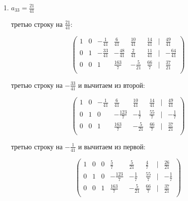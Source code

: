 \documentclass{report}
\begin{document}
\begin{itemize}
\begin{enumerate}
\begin{itemize}
				
				
				
			\end{itemize}
			
			\item{$a_{33}=\frac{21}{41}$}
			
			\begin{itemize}
				
				 третью строку на $\frac{21}{41}$:
				
				\begin{center}
					\Large{
						\[
						\begin{pmatrix}
							1 & 0 & -\frac{1}{41} & \frac{6}{41} & \frac{10}{41} & \frac{14}{41} & | & \frac{49}{41} \\
							0 & 1 & -\frac{33}{41} & -\frac{48}{41} & \frac{2}{41} & \frac{11}{41} & | & -\frac{64}{41} \\
							0 & 0 & 1 & \frac{163}{7} & -\frac{5}{21} & \frac{66}{7} & | & \frac{37}{21} \\
						\end{pmatrix}
						\]
					}
				\end{center}
				
				 третью строку на $-\frac{33}{41}$ и вычитаем из второй:
				
				\begin{center}
					\Large{
						\[
						\begin{pmatrix}
							1 & 0 & -\frac{1}{41} & \frac{6}{41} & \frac{10}{41} & \frac{14}{41} & | & \frac{49}{41} \\
							0 & 1 & 0 & -\frac{123}{7} & -\frac{1}{7} & \frac{55}{7} & | & -\frac{1}{7} \\
							0 & 0 & 1 & \frac{163}{7} & -\frac{5}{21} & \frac{66}{7} & | & \frac{37}{21} \\
						\end{pmatrix}
						\]
					}
				\end{center}
				
				 третью строку на $-\frac{1}{41}$ и вычитаем из первой:
				
				\begin{center}
					\Large{
						\[
						\begin{pmatrix}
							1 & 0 & 0 & \frac{5}{7} & \frac{5}{21} & \frac{4}{7} & | & \frac{26}{21} \\
							0 & 1 & 0 & -\frac{123}{7} & -\frac{1}{7} & \frac{55}{7} & | & -\frac{1}{7} \\
							0 & 0 & 1 & \frac{163}{7} & -\frac{5}{21} & \frac{66}{7} & | & \frac{37}{21} \\
						\end{pmatrix}
						\]
					}
				\end{center}
				

\end{itemize}
\end{enumerate}
\end{itemize}
\end{document}
